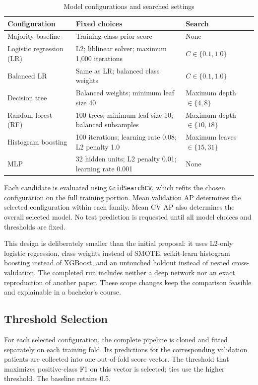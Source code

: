 \documentclass[conference]{IEEEtran}
\begin{document}
\begin{table}[!t]
\caption{Model configurations and searched settings}
\label{tab:models}
\centering
\footnotesize
\begin{tabular}{lll}
\toprule
Configuration & Fixed choices & Search \\
\midrule
Majority baseline & Training class-prior score & None \\
Logistic regression (LR) & L2; liblinear solver; maximum 1,000 iterations & $C\in\{0.1,1.0\}$ \\
Balanced LR & Same as LR; balanced class weights & $C\in\{0.1,1.0\}$ \\
Decision tree & Balanced weights; minimum leaf size 40 & Maximum depth $\in\{4,8\}$ \\
Random forest (RF) & 100 trees; minimum leaf size 10; balanced subsamples & Maximum depth $\in\{10,18\}$ \\
Histogram boosting & 100 iterations; learning rate 0.08; L2 penalty 1.0 & Maximum leaves $\in\{15,31\}$ \\
MLP & 32 hidden units; L2 penalty 0.01; learning rate 0.001 & None \\
\bottomrule
\end{tabular}
\end{table}

Each candidate is evaluated using \texttt{GridSearchCV}, which refits the chosen configuration on the full training portion. Mean validation AP determines the selected configuration within each family. Mean CV AP also determines the overall selected model. No test prediction is requested until all model choices and thresholds are fixed.

This design is deliberately smaller than the initial proposal: it uses L2-only logistic regression, class weights instead of SMOTE, scikit-learn histogram boosting instead of XGBoost, and an untouched holdout instead of nested cross-validation. The completed run includes neither a deep network nor an exact reproduction of another paper. These scope changes keep the comparison feasible and explainable in a bachelor's course.

\subsection{Threshold Selection}
For each selected configuration, the complete pipeline is cloned and fitted separately on each training fold. Its predictions for the corresponding validation patients are collected into one out-of-fold score vector. The threshold that maximizes positive-class F1 on this vector is selected; ties use the higher threshold. The baseline retains 0.5.
\end{document}
